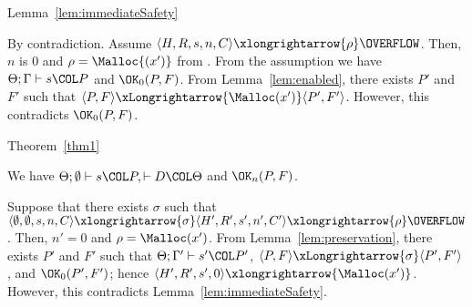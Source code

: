 \begin{pfof}{Lemma~\ref{lem:immediateSafety}}

By contradiction.  Assume \(\langle H, R, s, n, C \rangle
\xlongrightarrow{\rho} \OVERFLOW\). Then, \(n\) is \(0\) and \(\rho =
\Malloc{(x')}\) from .  From the assumption we have
\(\Theta;\Gamma \vdash s \COL P\) and \(\OK_0(P, F)\).  From
Lemma~\ref{lem:enabled}, there exists \(P'\) and \(F'\) such that \(
\langle P, F \rangle \xLongrightarrow{\Malloc(x')} \langle P', F'
\rangle\).  However, this contradicts \(\OK_0(P, F)\).

\end{pfof}

\begin{pfof}{Theorem~\ref{thm1}}

We have \(\Theta;\emptyset \vdash s\COL P, \vdash D\COL \Theta\) and
\(\OK_n(P, F)\).

Suppose that there exists \(\sigma\) such that \(\langle \emptyset,
\emptyset, s, n, C\rangle \xlongrightarrow{\sigma} \langle H', R', s',
n', C'\rangle \xlongrightarrow{\rho} \OVERFLOW\).  Then, \(n' = 0\)
and \(\rho = \Malloc(x')\).  From Lemma~\ref{lem:preservation}, there
exists \(P'\) and \(F'\) such that \(\Theta; \Gamma' \vdash s' \COL
P'\), \( \langle P, F \rangle \xLongrightarrow{\sigma} \langle P', F'
\rangle \), and \(\OK_0(P', F')\); hence \(\langle H', R', s',
0\rangle \xlongrightarrow{\Malloc(x')}\).  However, this contradicts
Lemma~\ref{lem:immediateSafety}.

\end{pfof}
